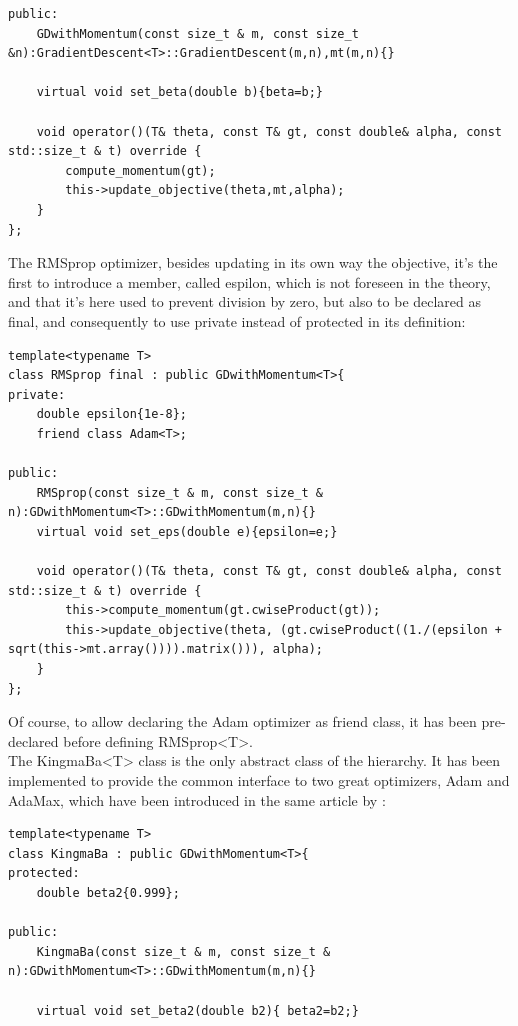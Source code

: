 \documentclass[12pt, a4paper]{report}
\theoremstyle{definition}
\begin{document}
{\begin{lstlisting}[frame=single]
public:
	GDwithMomentum(const size_t & m, const size_t &n):GradientDescent<T>::GradientDescent(m,n),mt(m,n){}

	virtual void set_beta(double b){beta=b;}

	void operator()(T& theta, const T& gt, const double& alpha, const std::size_t & t) override {
		compute_momentum(gt);
		this->update_objective(theta,mt,alpha);
	}
};
\end{lstlisting}
The RMSprop optimizer, besides updating in its own way the objective, it's the first to introduce a member, called espilon, which is not foreseen in the theory, and that it's here used to prevent division by zero, but also to be declared as final, and consequently to use {\ttfamily private} instead of {\ttfamily protected} in its definition: 
\begin{lstlisting}[frame=single]
template<typename T>
class RMSprop final : public GDwithMomentum<T>{
private:
	double epsilon{1e-8};
	friend class Adam<T>;

public:
	RMSprop(const size_t & m, const size_t & n):GDwithMomentum<T>::GDwithMomentum(m,n){}
	virtual void set_eps(double e){epsilon=e;}

	void operator()(T& theta, const T& gt, const double& alpha, const std::size_t & t) override {
		this->compute_momentum(gt.cwiseProduct(gt));
		this->update_objective(theta, (gt.cwiseProduct((1./(epsilon + sqrt(this->mt.array()))).matrix())), alpha);
	}
};
\end{lstlisting}
\noindent Of course, to allow declaring the Adam optimizer as friend class, it has been pre-declared before defining {\ttfamily RMSprop<T>}.\\
The {\ttfamily KingmaBa<T>} class is the only abstract class of the hierarchy. It has been implemented to provide the common interface to two great optimizers, Adam and AdaMax, which have been introduced in the same article by \cite{Kingma}:
\begin{lstlisting}[frame=single]
template<typename T>
class KingmaBa : public GDwithMomentum<T>{
protected:
	double beta2{0.999};

public:
	KingmaBa(const size_t & m, const size_t & n):GDwithMomentum<T>::GDwithMomentum(m,n){}
	
	virtual void set_beta2(double b2){ beta2=b2;}


\end{lstlisting}}
\end{document}
